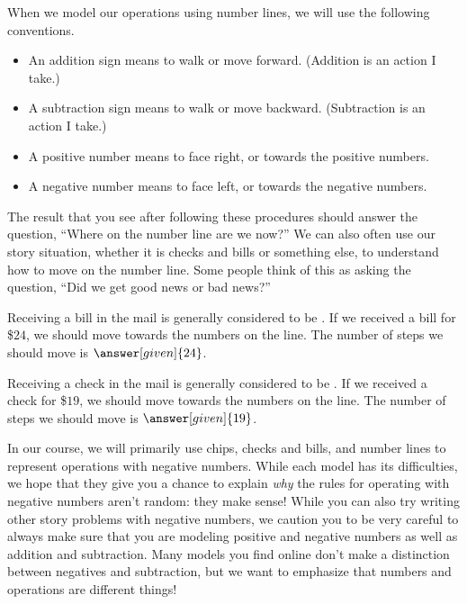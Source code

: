 \documentclass{ximera}
\begin{document}
When we model our operations using number lines, we will use the following conventions.
\begin{itemize}
	\item An addition sign means to walk or move forward. (Addition is an action I take.)
	\item A subtraction sign means to walk or move backward. (Subtraction is an action I take.)
	\item A positive number means to face right, or towards the positive numbers.
	\item A negative number means to face left, or towards the negative numbers.
\end{itemize}
The result that you see after following these procedures should answer the question, ``Where on the number line are we now?''  We can also often use our story situation, whether it is checks and bills or something else, to understand how to move on the number line.  Some people think of this as asking the question, ``Did we get good news or bad news?'' 
\begin{example}
Receiving a bill in the mail is generally considered to be .  If we received a bill for \$$24$, we should move towards the  numbers on the line.  The number of steps we should move is $\answer[given]{24}$.

Receiving a check in the mail is generally considered to be .  If we received a check for \$$19$, we should move towards the  numbers on the line.  The number of steps we should move is $\answer[given]{19}$.
\end{example}


In our course, we will primarily use chips, checks and bills, and number lines to represent operations with negative numbers. While each model has its difficulties, we hope that they give you a chance to explain {\em why} the rules for operating with negative numbers aren't random: they make sense! While you can also try writing other story problems with negative numbers, we caution you to be very careful to always make sure that you are modeling positive and negative numbers as well as addition and subtraction. Many models you find online don't make a distinction between negatives and subtraction, but we want to emphasize that numbers and operations are different things!
\end{document}
